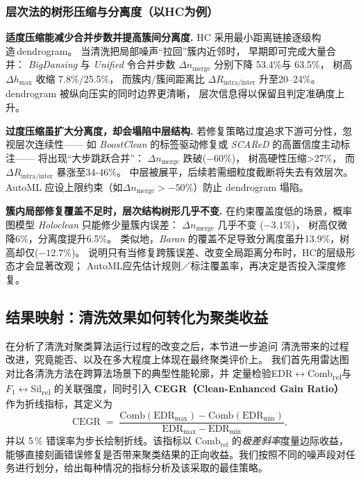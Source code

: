 \documentclass[10pt]{article} %
\numberwithin{equation}{section}
\begin{document}
\subsubsection{层次法的树形压缩与分离度（以HC为例）}
\label{subsec:hierarch_dynamics}

\medskip
\noindent%
\textbf{适度压缩能减少合并步数并提高簇间分离度.}\;
HC 采用最小距离链接逐级构造 dendrogram。
当清洗把局部噪声“拉回”簇内近邻时，
早期即可完成大量合并：
\textit{BigDansing} 与 \textit{Unified} 令合并步数 $\Delta n_{\text{merge}}$ 分别下降 53.4\%与 63.5\%，
树高 $\Delta h_{\max}$ 收缩 7.8\%/25.5\%，
而簇内/簇间距离比 $\Delta R_{\text{intra/inter}}$ 升至20–24\%。
dendrogram 被纵向压实的同时边界更清晰，
层次信息得以保留且判定准确度上升。

\medskip
\noindent%
\textbf{过度压缩虽扩大分离度，却会塌陷中层结构.}\;
若修复策略过度追求下游可分性，忽视层次连续性——
如 \textit{BoostClean} 的标签驱动修复或 \textit{SCAReD} 的高置信度主动标注——%
将出现“大步跳跃合并”：
$\Delta n_{\text{merge}}$ 跌破(\(-60\%\))，
树高硬性压缩>27\%，
而 $\Delta R_{\text{intra/inter}}$ 暴涨至34-46\%。
中层被展平，后续若需细粒度截断将失去有效层次。
AutoML 应设上限约束（如$\Delta n_{\text{merge}}>-50\%$）防止 dendrogram 塌陷。

\medskip
\noindent%
\textbf{簇内局部修复覆盖不足时，层次结构树形几乎不变.}\;
在约束覆盖度低的场景，概率图模型 \textit{Holoclean} 只能修少量簇内误差：
$\Delta n_{\text{merge}}$ 几乎不变 (\(-3.1\%\))，
树高仅微降6\%，分离度提升6.5\%。
类似地，\textit{Baran} 的覆盖不足导致分离度虽升13.9\%，树高却仅(\(-12.7\%\))。
说明只有当修复跨簇误差、改变全局距离分布时，HC的层级形态才会显著改观；
AutoML应先估计规则／标注覆盖率，再决定是否投入深度修复。

\subsection{结果映射：清洗效果如何转化为聚类收益}
\label{sec:q3-metric}

在分析了清洗对聚类算法运行过程的改变之后，本节进一步追问  
清洗带来的过程改进，究竟能否、以及在多大程度上体现在最终聚类评价上。
我们首先用雷达图对比各清洗方法在跨算法场景下的典型性能轮廓，并  
定量检验EDR$\leftrightarrow$Comb\textsubscript{rel}与\(F_1\)$\leftrightarrow$Sil\textsubscript{rel} 的关联强度，同时引入 \textbf{CEGR（Clean-Enhanced Gain Ratio）} 作为折线指标，其定义为
\begin{equation}
  \mathrm{CEGR}
  \;=\;
  \frac{\text{Comb}(\mathrm{EDR}_{\max})-\text{Comb}(\mathrm{EDR}_{\min})}
       {\mathrm{EDR}_{\max}-\mathrm{EDR}_{\min}},
  \label{eq:cegr-def}
\end{equation}
并以 5\,\% 错误率为步长绘制折线。该指标以 \(\text{Comb}_{\text{rel}}\) 的\emph{极差斜率}度量边际收益，能够直接刻画错误修复是否带来聚类结果的正向收益。我们按照不同的噪声段对任务进行划分，给出每种情况的指标分析及该采取的最佳策略。
\end{document}
